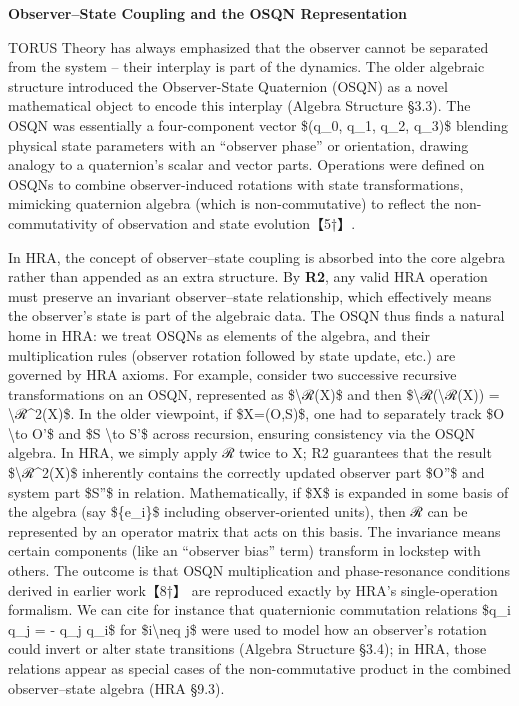\documentclass[]{article}
\begin{document}
\textbf{Observer--State Coupling and the OSQN Representation}

TORUS Theory has always emphasized that the observer cannot be separated
from the system -- their interplay is part of the dynamics. The older
algebraic structure introduced the Observer-State Quaternion (OSQN) as a
novel mathematical object to encode this interplay (Algebra Structure
§3.3). The OSQN was essentially a four-component vector \$(q\_0, q\_1,
q\_2, q\_3)\$ blending physical state parameters with an ``observer
phase'' or orientation, drawing analogy to a quaternion's scalar and
vector parts. Operations were defined on OSQNs to combine
observer-induced rotations with state transformations, mimicking
quaternion algebra (which is non-commutative) to reflect the
non-commutativity of observation and state evolution【5†】.

In HRA, the concept of observer--state coupling is absorbed into the
core algebra rather than appended as an extra structure. By \textbf{R2},
any valid HRA operation must preserve an invariant observer--state
relationship, which effectively means the observer's state is part of
the algebraic data. The OSQN thus finds a natural home in HRA: we treat
OSQNs as elements of the algebra, and their multiplication rules
(observer rotation followed by state update, etc.) are governed by HRA
axioms. For example, consider two successive recursive transformations
on an OSQN, represented as \$\textbackslash{}ℛ(X)\$ and then
\$\textbackslash{}ℛ(\textbackslash{}ℛ(X)) = \textbackslash{}ℛ\^{}2(X)\$.
In the older viewpoint, if \$X=(O,S)\$, one had to separately track \$O
\textbackslash{}to O'\$ and \$S \textbackslash{}to S'\$ across
recursion, ensuring consistency via the OSQN algebra. In HRA, we simply
apply ℛ twice to X; R2 guarantees that the result
\$\textbackslash{}ℛ\^{}2(X)\$ inherently contains the correctly updated
observer part \$O''\$ and system part \$S''\$ in relation.
Mathematically, if \$X\$ is expanded in some basis of the algebra (say
\$\{e\_i\}\$ including observer-oriented units), then ℛ can be
represented by an operator matrix that acts on this basis. The
invariance means certain components (like an ``observer bias'' term)
transform in lockstep with others. The outcome is that OSQN
multiplication and phase-resonance conditions derived in earlier
work【8†】 are reproduced exactly by HRA's single-operation formalism.
We can cite for instance that quaternionic commutation relations \$q\_i
q\_j = - q\_j q\_i\$ for \$i\textbackslash{}neq j\$ were used to model
how an observer's rotation could invert or alter state transitions
(Algebra Structure §3.4); in HRA, those relations appear as special
cases of the non-commutative product in the combined observer--state
algebra (HRA §9.3).
\end{document}
